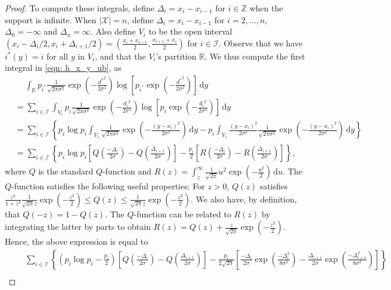 \documentclass[10pt,a4paper]{amsart}
\newcommand{\bbR}{\mathbb{R}}
\newcommand{\bbZ}{\mathbb{Z}}
\newcommand{\calI}{\mathcal{I}}
\newcommand{\calX}{\mathcal{X}}
\newcommand{\intR}{\int_{\bbR}}
\renewcommand{\d}{\,\mathrm{d}}
\begin{document}
\begin{proof}[Proof]
		To compute these integrals, define $\Delta_i = x_i - x_{i-1}$ for $i \in \bbZ$ when the support is infinite.  When $|\calX| = n$, define $\Delta_i = x_i - x_{i-1}$ for $i = 2,\dots,n$, $\Delta_0 = -\infty$ and $\Delta_n = \infty$.
		Also define $V_i$ to be the open interval $(x_i - \Delta_i/2, x_i + \Delta_{i+1}/2) = (\frac{x_i + x_{i-1}}{2}, \frac{x_{i+1} + x_{i}}{2})$ for $i \in \calI$. Observe that we have $i^*(y) = i$ for all $y$ in $V_i$, and that the $V_i$'s partition $\bbR$.
		We thus compute the first integral in \eqref{eqn: h_x_y_ub}, as
		\begin{align*}
			&\quad \ \intR p_{i^*} \tfrac{1}{\sqrt{2\pi \sigma^2}}\exp\left(-\tfrac{{d^*}^2}{2\sigma^2}\right) \log \left[p_{i^*} \exp\left(-\tfrac{{d^*}^2}{2\sigma^2}\right)\right]\d y\\
			&= \sum_{i \in \calI} \int_{V_i} p_{i} \tfrac{1}{\sqrt{2\pi \sigma^2}}\exp\left(-\tfrac{{d_i}^2}{2\sigma^2}\right) \log \left[p_{i} \exp\left(-\tfrac{{d_i}^2}{2\sigma^2}\right)\right]\d y\\
			&= \sum_{i \in \calI} \left\{ p_i\log p_i \int_{V_i}  \tfrac{1}{\sqrt{2\pi \sigma^2}}\exp\left(-\tfrac{(y-x_i)^2}{2\sigma^2}\right) \d y - p_i\int_{V_i} \frac{(y-x_i)^2}{2\sigma^2}\tfrac{1}{\sqrt{2\pi \sigma^2}}\exp\left(-\tfrac{(y-x_i)^2}{2\sigma^2}\right) \d y \right\}\\
			&= \sum_{i \in \calI} \left\{ p_i\log p_i \left[Q\left(\tfrac{-\Delta_i}{2\sigma}\right)-Q\left(\tfrac{\Delta_{i+1}}{2\sigma}\right)\right] - \frac{p_i}{2}\left[R\left(\tfrac{-\Delta_i}{2\sigma}\right)-R\left(\tfrac{\Delta_{i+1}}{2\sigma}\right)\right] \right\},
		\end{align*}
		where $Q$ is the standard $Q$-function and $R(z) = \int_z^{\infty} \frac1{\sqrt{2\pi}}u^2\exp(-\frac{u^2}{2}) \d u$.
		The $Q$-function satisfies the following useful properties: For $z > 0$, $Q(z)$ satisfies $\frac{z^2}{1+z^2} \frac{1}{\sqrt{2\pi}z}\exp(-\frac{z^2}{2}) \leq Q(z) \leq \frac{1}{\sqrt{2\pi}z}\exp(-\frac{z^2}{2})$. We also have, by definition, that $Q(-z) = 1-Q(z)$.
		The $Q$-function can be related to $R(z)$ by integrating the latter by parts to obtain $R(z) = Q(z) + \frac{z}{\sqrt{2\pi}}\exp(-\frac{z^2}{2})$. Hence, the above expression is equal to 
		\begin{align*}
			&\quad \ \sum_{i \in \calI} \left\{ \left(p_i\log p_i-\tfrac{p_i}{2}\right) \left[Q\left(\tfrac{-\Delta_i}{2\sigma}\right)-Q\left(\tfrac{\Delta_{i+1}}{2\sigma}\right)\right] - \tfrac{p_i}{2\sqrt{2\pi}}\left[\tfrac{-\Delta_i}{2\sigma}\exp\left(\tfrac{-\Delta_i^2}{8\sigma^2}\right)-\tfrac{\Delta_{i+1}}{2\sigma}\exp\left(\tfrac{-\Delta_{i+1}^2}{8\sigma^2}\right)\right] \right\} \\ 

\end{align*}
\end{proof}
\end{document}
